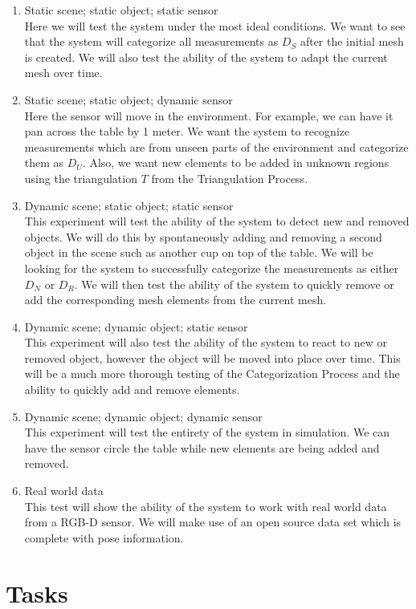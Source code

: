 \documentclass[12pt]{article}
\begin{document}
\begin{enumerate}
\item Static scene; static object; static sensor \\
Here we will test the system under the most ideal conditions. We want to
see that the system will categorize all measurements as $D_S$ after the
initial mesh is created. We will also test the ability of the system to
adapt the current mesh over time.  
\item Static scene; static object; dynamic sensor \\
Here the sensor will move in the environment. For example, we can have it
pan across the table by 1 meter. We want the system to recognize
measurements which are from unseen parts of the environment and categorize
them as $D_U$. Also, we want new elements to be added in unknown regions
using the triangulation $T$ from the Triangulation Process.  
\item Dynamic scene; static object; static sensor \\
This experiment will test the ability of the system to detect new and
removed objects. We will do this by spontaneously adding and removing a
second object in the scene such as another cup on top of the table. We will
be looking for the system to successfully categorize the measurements as
either $D_N$ or $D_R$. We will then test the ability of the system to
quickly remove or add the corresponding mesh elements from the current
mesh. 
\item Dynamic scene; dynamic object; static sensor \\
This experiment will also test the ability of the system to react to new or
removed object, however the object will be moved into place over time. This
will be a much more thorough testing of the Categorization Process and the
ability to quickly add and remove elements. 
\item Dynamic scene; dynamic object; dynamic sensor \\
This experiment will test the entirety of the system in simulation. We can
have the sensor circle the table while new elements are being added and
removed. 
\item Real world data \\ 
This test will show the ability of the system to work with real world data
from a RGB-D sensor. We will make use of an open source data set which is
complete with pose information. 
\end{enumerate}

\section{Tasks}
\label{ch:tasks}
\end{document}
